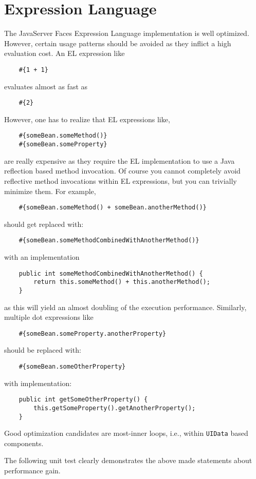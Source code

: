 \section{Expression Language}
The JavaServer Faces Expression Language implementation is well optimized.
However, certain usage patterns should be avoided as they inflict a high evaluation cost.
An EL expression like
\begin{lstlisting}
	#{1 + 1}
\end{lstlisting}
evaluates almost as fast as
\begin{lstlisting}
	#{2}
\end{lstlisting}
However, one has to realize that EL expressions like,
\begin{lstlisting}
	#{someBean.someMethod()}
	#{someBean.someProperty}
\end{lstlisting}
are really expensive as they require the EL implementation to use a Java reflection based method invocation.
Of course you cannot completely avoid reflective method invocations within EL expressions, but you can trivially minimize them.
For example,
\begin{lstlisting}
	#{someBean.someMethod() + someBean.anotherMethod()}
\end{lstlisting}
should get replaced with:
\begin{lstlisting}
	#{someBean.someMethodCombinedWithAnotherMethod()}
\end{lstlisting}
with an implementation
\begin{lstlisting}
	public int someMethodCombinedWithAnotherMethod() {
		return this.someMethod() + this.anotherMethod();
	}
\end{lstlisting}
as this will yield an almost doubling of the execution performance.
Similarly, multiple dot expressions like
\begin{lstlisting}
	#{someBean.someProperty.anotherProperty}
\end{lstlisting}
should be replaced with:
\begin{lstlisting}
	#{someBean.someOtherProperty}
\end{lstlisting}
with implementation:
\begin{lstlisting}
	public int getSomeOtherProperty() {
		this.getSomeProperty().getAnotherProperty();
	}
\end{lstlisting}
Good optimization candidates are most-inner loops, i.e., within \texttt{UIData} based components.

The following unit test clearly demonstrates the above made statements about performance gain.



